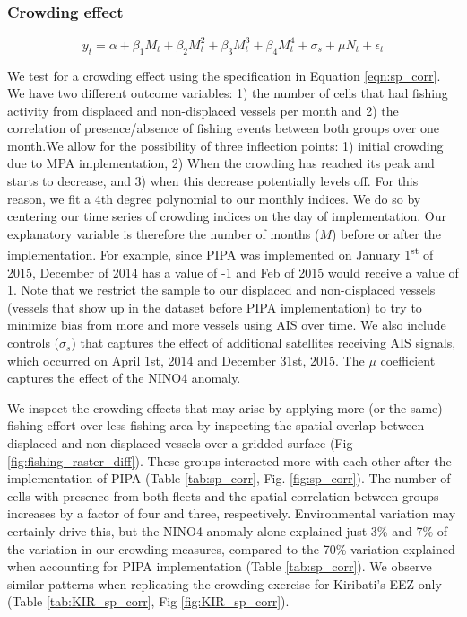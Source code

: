 \documentclass[12pt]{article}
\begin{document}
\subsubsection{Crowding effect}

\begin{equation}
y_t = \alpha + \beta_1 M_t + \beta_2 M_t^2 + \beta_3 M_t^3 + \beta_4 M_t ^4 + \sigma_s + \mu N_t + \epsilon_t
\label{eqn:sp_corr}
\end{equation}

We test for a crowding effect using the specification in Equation \ref{eqn:sp_corr}. We have two different outcome variables:
1) the number of cells that had fishing activity from displaced and non-displaced vessels per month and 2) the correlation of presence/absence of fishing events between both groups over one month.We allow for the possibility of three inflection points: 1) initial crowding due to MPA implementation, 2) When the crowding has reached its peak and starts to decrease, and 3) when this decrease potentially levels off. For this reason, we fit a 4th degree polynomial to our monthly indices. We do so by centering our time series of crowding indices on the day of implementation. Our explanatory variable is therefore the number of months ($M$) before or after the implementation. For example, since PIPA was implemented on January 1\textsuperscript{st} of 2015, December of 2014 has a value of -1 and Feb of 2015 would receive a value of 1. Note that we restrict the sample to our displaced and non-displaced vessels (vessels that show up in the dataset before PIPA implementation) to try to minimize bias from more and more vessels using AIS over time. We also include controls ($\sigma_s$) that captures the effect of additional satellites receiving AIS signals, which occurred on April 1st, 2014 and December 31st, 2015. The $\mu$ coefficient captures the effect of the NINO4 anomaly.

We inspect the crowding effects that may arise by applying more (or the same) fishing effort over less fishing area by inspecting the spatial overlap between displaced and non-displaced vessels over a gridded surface (Fig \ref{fig:fishing_raster_diff}). These groups interacted more with each other after the implementation of PIPA (Table \ref{tab:sp_corr}, Fig. \ref{fig:sp_corr}). The number of cells with presence from both fleets and the spatial correlation between groups increases by a factor of four and three, respectively. Environmental variation may certainly drive this, but the NINO4 anomaly alone explained just 3\% and 7\% of the variation in our crowding measures, compared to the 70\% variation explained when accounting for PIPA implementation (Table \ref{tab:sp_corr}). We observe similar patterns when replicating the crowding exercise for Kiribati's EEZ only (Table \ref{tab:KIR_sp_corr}, Fig \ref{fig:KIR_sp_corr}).
\end{document}
